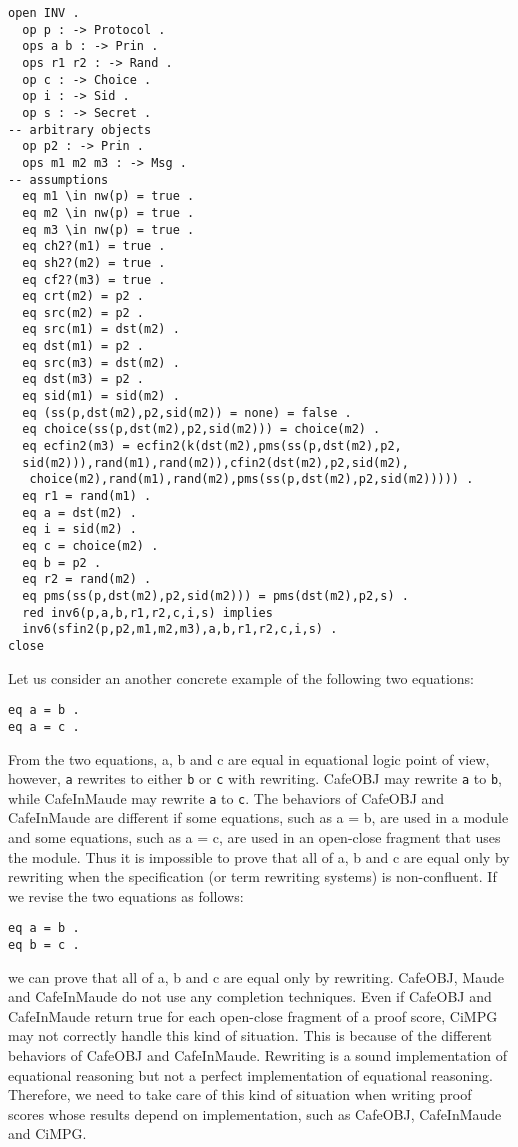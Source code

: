 \documentclass[a4paper,fleqn]{cas-dc}
\begin{document}
\begin{small}
\begin{verbatim}
open INV .
  op p : -> Protocol .
  ops a b : -> Prin .
  ops r1 r2 : -> Rand .
  op c : -> Choice .
  op i : -> Sid .
  op s : -> Secret .
-- arbitrary objects
  op p2 : -> Prin .
  ops m1 m2 m3 : -> Msg .
-- assumptions
  eq m1 \in nw(p) = true .
  eq m2 \in nw(p) = true .
  eq m3 \in nw(p) = true .
  eq ch2?(m1) = true .
  eq sh2?(m2) = true .
  eq cf2?(m3) = true .
  eq crt(m2) = p2 .
  eq src(m2) = p2 .
  eq src(m1) = dst(m2) .
  eq dst(m1) = p2 .
  eq src(m3) = dst(m2) .
  eq dst(m3) = p2 .
  eq sid(m1) = sid(m2) .
  eq (ss(p,dst(m2),p2,sid(m2)) = none) = false .
  eq choice(ss(p,dst(m2),p2,sid(m2))) = choice(m2) .
  eq ecfin2(m3) = ecfin2(k(dst(m2),pms(ss(p,dst(m2),p2,
  sid(m2))),rand(m1),rand(m2)),cfin2(dst(m2),p2,sid(m2),
   choice(m2),rand(m1),rand(m2),pms(ss(p,dst(m2),p2,sid(m2))))) .
  eq r1 = rand(m1) .
  eq a = dst(m2) .
  eq i = sid(m2) .
  eq c = choice(m2) .
  eq b = p2 .
  eq r2 = rand(m2) .
  eq pms(ss(p,dst(m2),p2,sid(m2))) = pms(dst(m2),p2,s) .
  red inv6(p,a,b,r1,r2,c,i,s) implies
  inv6(sfin2(p,p2,m1,m2,m3),a,b,r1,r2,c,i,s) .
close
\end{verbatim}
\end{small}

Let us consider an another concrete example of the following two equations:
\begin{small}
\begin{verbatim}
eq a = b .
eq a = c .
\end{verbatim}
\end{small}
From the two equations, a, b and c are equal in equational logic point of view, however, \verb!a! rewrites to either \verb!b! or \verb!c! with rewriting.
CafeOBJ may rewrite \verb!a! to \verb!b!, while CafeInMaude may rewrite \verb!a! to \verb!c!. The behaviors of CafeOBJ and CafeInMaude are different if some
equations, such as a = b, are used in a module and some equations, such as a = c, are used in an open-close fragment that uses the module. Thus it is impossible to prove that all of a, b and c are equal only by rewriting when the specification (or term rewriting systems) is non-confluent.
If we revise the two equations as follows:
\begin{small}
\begin{verbatim}
eq a = b .
eq b = c .
\end{verbatim}
\end{small}
we can prove that all of a, b and c are equal only by rewriting. CafeOBJ, Maude and CafeInMaude do not use any completion techniques. Even if CafeOBJ and CafeInMaude return true for each open-close fragment of a proof
score, CiMPG may not correctly handle this kind of situation. This is because of the different behaviors of CafeOBJ and CafeInMaude. Rewriting is a sound implementation of equational reasoning but not a perfect implementation of equational reasoning. Therefore, we need to take care of this kind of situation when writing proof scores whose results depend on implementation, such as CafeOBJ, CafeInMaude and CiMPG.
\end{document}
